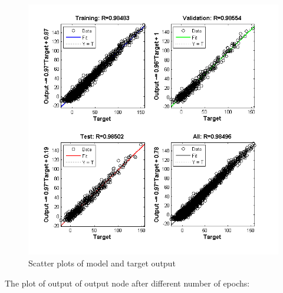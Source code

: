 \documentclass{article}
\begin{document}
\begin{figure}[H]
\centering
\includegraphics[width=\linewidth]{Regression/bivariate/scatter_1layer.png}
\caption{Scatter plots of model and target output}
\end{figure}

The plot of output of output node after different number of epochs:
\end{document}
